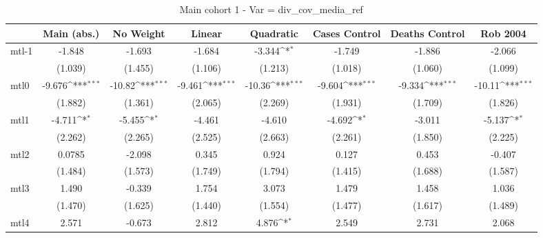 \documentclass{article}
\begin{document}
{
\def\sym#1{\ifmmode^{#1}\else\(^{#1}\)\fi}
\begin{longtable}{l*{7}{c}}
\caption{Main cohort 1 - Var = div\_cov\_media\_ref}\\
\hline\hline\endfirsthead\hline\endhead\hline\endfoot\endlastfoot
                &\multicolumn{1}{c}{Main (abs.)}&\multicolumn{1}{c}{No Weight}&\multicolumn{1}{c}{Linear}&\multicolumn{1}{c}{Quadratic}&\multicolumn{1}{c}{Cases Control}&\multicolumn{1}{c}{Deaths Control}&\multicolumn{1}{c}{Rob 2004}\\
\hline
mtl-1           &   -1.848         &   -1.693         &   -1.684         &   -3.344\sym{*}  &   -1.749         &   -1.886         &   -2.066         \\
                &  (1.039)         &  (1.455)         &  (1.106)         &  (1.213)         &  (1.018)         &  (1.060)         &  (1.099)         \\
mtl0            &   -9.676\sym{***}&   -10.82\sym{***}&   -9.461\sym{***}&   -10.36\sym{***}&   -9.604\sym{***}&   -9.334\sym{***}&   -10.11\sym{***}\\
                &  (1.882)         &  (1.361)         &  (2.065)         &  (2.269)         &  (1.931)         &  (1.709)         &  (1.826)         \\
mtl1            &   -4.711\sym{*}  &   -5.455\sym{*}  &   -4.461         &   -4.610         &   -4.692\sym{*}  &   -3.011         &   -5.137\sym{*}  \\
                &  (2.262)         &  (2.265)         &  (2.525)         &  (2.663)         &  (2.261)         &  (1.850)         &  (2.225)         \\
mtl2            &   0.0785         &   -2.098         &    0.345         &    0.924         &    0.127         &    0.453         &   -0.407         \\
                &  (1.484)         &  (1.573)         &  (1.749)         &  (1.794)         &  (1.415)         &  (1.688)         &  (1.587)         \\
mtl3            &    1.490         &   -0.339         &    1.754         &    3.073         &    1.479         &    1.458         &    1.036         \\
                &  (1.470)         &  (1.625)         &  (1.440)         &  (1.554)         &  (1.477)         &  (1.617)         &  (1.489)         \\
mtl4            &    2.571         &   -0.673         &    2.812         &    4.876\sym{*}  &    2.549         &    2.731         &    2.068         \\

\end{longtable}}
\end{document}
